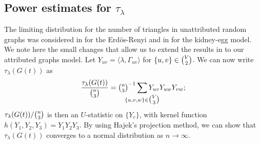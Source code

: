 \documentclass[10pt,draftclsnofoot,onecolumn]{IEEEtran}
\theoremstyle{definition}
\def\clap#1{\hbox to 0pt{\hss#1\hss}}
\def\mathclap{\mathpalette\mathclapinternal}
\def\mathclapinternal#1#2{%
\clap{$\mathsurround=0pt#1{#2}$}%
}
\begin{document}
\subsection{Power estimates for $\tau_{\lambda}$}
\label{sec:power-estim-tau_l}
The limiting distribution for the number of triangles in unattributed
random graphs was considered in
\cite{nowicki88:_subgr_u_statis_method} for the Erd\"{o}s-Renyi and in
\cite{rukhin09:_asymp_analy_various_statis_random_graph_infer} for the
kidney-egg model. We note here the small changes that allow us to
extend the results in
\cite{rukhin09:_asymp_analy_various_statis_random_graph_infer,%
nowicki88:_subgr_u_statis_method} to our attributed graphs model. Let
$Y_{uv} = \langle \lambda, \Gamma_{uv} \rangle$ for $\{u,v\} \in
\tbinom{V}{2}$. We can now write $\tau_{\lambda}(G(t))$ as
\begin{equation}
  \label{eq:45}
  \frac{\tau_{\lambda}(G(t))}{\tbinom{n}{3}} = \tbinom{n}{3}^{-1}
  \sum_{\mathclap{\{u,v,w\} \in \tbinom{V}{3}}} Y_{uv} Y_{uw} Y_{vw};
\end{equation}
$\tau_{\lambda}(G(t))/\tbinom{n}{3}$ is then an
$U$-statistic on $\{Y_{e}\}$, with kernel function $h(Y_{1}, Y_{2},
Y_{3}) = Y_{1} Y_{2} Y_{3}$. By using Hajek's projection method, we
can show that $\tau_{\lambda}(G(t))$ converges to a normal
distribution as $n \rightarrow \infty$. 
\end{document}
